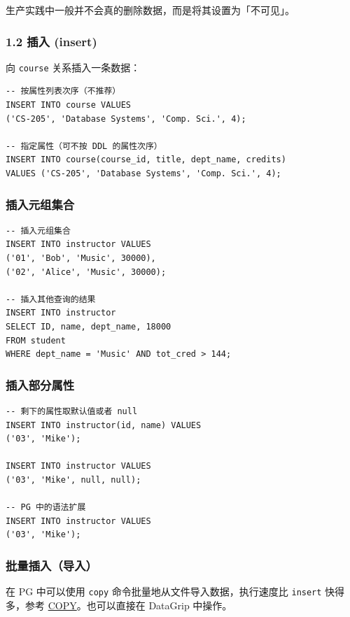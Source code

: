 \documentclass[aspectratio=169, 14pt]{beamer}
\begin{document}
{
\begin{frame}[standout]
	生产实践中一般并不会真的删除数据，而是将其设置为「不可见」。
\end{frame}
}

\begin{frame}[fragile]
	\frametitle{1.2 插入 (insert)}
	向 \texttt{course} 关系插入一条数据：

	\begin{verbatim}
-- 按属性列表次序（不推荐）
INSERT INTO course VALUES 
('CS-205', 'Database Systems', 'Comp. Sci.', 4);

-- 指定属性（可不按 DDL 的属性次序）
INSERT INTO course(course_id, title, dept_name, credits)
VALUES ('CS-205', 'Database Systems', 'Comp. Sci.', 4);
\end{verbatim}

\end{frame}

\begin{frame}[fragile]
	\frametitle{插入元组集合}
	\begin{verbatim}
-- 插入元组集合
INSERT INTO instructor VALUES 
('01', 'Bob', 'Music', 30000),
('02', 'Alice', 'Music', 30000);

-- 插入其他查询的结果
INSERT INTO instructor
SELECT ID, name, dept_name, 18000
FROM student
WHERE dept_name = 'Music' AND tot_cred > 144;
    \end{verbatim}

\end{frame}

\begin{frame}[fragile]
	\frametitle{插入部分属性}
	\begin{verbatim}
-- 剩下的属性取默认值或者 null
INSERT INTO instructor(id, name) VALUES 
('03', 'Mike');

INSERT INTO instructor VALUES 
('03', 'Mike', null, null);

-- PG 中的语法扩展
INSERT INTO instructor VALUES 
('03', 'Mike');
    \end{verbatim}
\end{frame}

\begin{frame}
	\frametitle{批量插入（导入）}

	{\Huge {}  }

	在 PG 中可以使用 \texttt{copy} 命令批量地从文件导入数据，执行速度比 \texttt{insert} 快得多，参考 \href{https://www.postgresql.org/docs/14/sql-copy.html}{COPY}。也可以直接在 DataGrip 中操作。

\end{frame}
\end{document}
